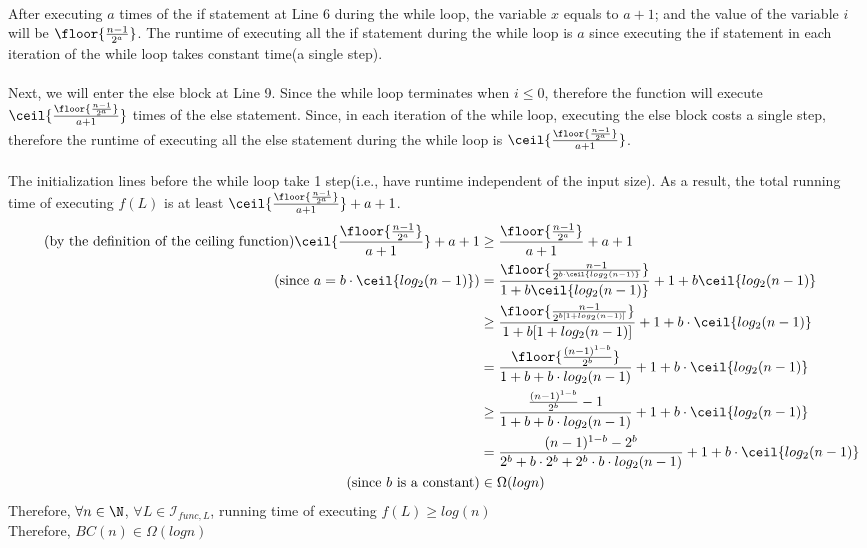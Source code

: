 \documentclass[12pt]{article}
\begin{document}
\\
After executing $a$ times of the if statement at Line 6 during the while loop, the variable $x$ equals to $a + 1$; and the value of the variable $i$ will be $\floor{\frac{n-1}{2^a}}$. The runtime of executing all the if statement during the while loop is $a$ since executing the if statement in each iteration of the while loop takes constant time(a single step).\\
\\
Next, we will enter the else block at Line 9. Since the while loop terminates when $i \le 0$, therefore the function will execute $\ceil{\frac{\floor{\frac{n-1}{2^a}}}{a+1}}$ times of the else statement. Since, in each iteration of the while loop, executing the else block costs a single step, therefore the runtime of executing all the else statement during the while loop is $\ceil{\frac{\floor{\frac{n-1}{2^a}}}{a+1}}$.\\
\\
The initialization lines before the while loop take 1 step(i.e., have runtime independent of the input size). As a result, the total running time of executing $f(L)$ is at least $\ceil{\frac{\floor{\frac{n-1}{2^a}}}{a+1}} + a+1$.\\
\begin{align*}
    \tag{by the definition of the ceiling function}
    \ceil{\frac{\floor{\frac{n-1}{2^a}}}{a+1}} + a+1 &\ge \frac{\floor{\frac{n-1}{2^a}}}{a+1} + a+1\\
    \tag{since $a = b\cdot \ceil{log_2(n-1)}$}
    &=\frac{\floor{\frac{n-1}{2^{b\cdot \ceil{log_2(n-1)}}}}}{1+b\ceil{log_2(n-1)}} + 1+b\ceil{log_2(n-1)}\\
    &\ge \frac{\floor{\frac{n-1}{2^{b[1+log_2(n-1)]}}}}{1+b[1+log_2(n-1)]}+1+b\cdot \ceil{log_2(n-1)}\\
    &= \frac{\floor{\frac{(n-1)^{1-b}}{2^b}}}{1+b+b\cdot log_2(n-1)} + 1+b\cdot \ceil{log_2(n-1)}\\
    &\ge \frac{\frac{(n-1)^{1-b}}{2^b} - 1}{1+b+b\cdot log_2(n-1)}+1+b\cdot \ceil{log_2(n-1)}\\
    &= \frac{(n-1)^{1-b}-2^b}{2^b+b\cdot 2^b+2^b\cdot b\cdot log_2(n-1)}+1+b\cdot \ceil{log_2(n-1)}\\
    \tag{since $b$ is a constant}
    &\in \Omega(logn)
\end{align*}
Therefore, $\forall n \in \N$, $\forall L \in \mathcal{I}_{func,L}$, running time of executing $f(L) \ge log(n)$\\
Therefore, $BC(n) \in \Omega(logn)$\\
\\
\end{document}
